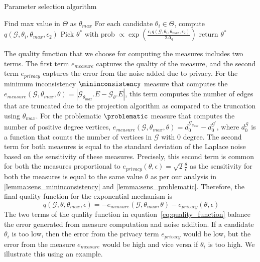\begin{algorithm}
\caption{Parameter selection algorithm}
\label{algo:expo_mech}
    Find max value in $\Theta$ as $\theta_{max}$ \;
    For each candidate $\theta_i \in \Theta$, compute $q(\mathcal{G}, \theta_i, \theta_{max},  \epsilon_2)$ \;
    Pick $\theta^*$ with prob $\propto \exp( \frac{\epsilon_1 q(\mathcal{G}, \theta_i, \theta_{max}, \epsilon_2)}{2\Delta_q})$\;
    return $\theta^*$\;

\end{algorithm}

The quality function that we choose for computing the measures includes two terms. The first term $e_{measure}$  captures the quality of the measure, and the second term $e_{privacy}$ captures the error from the noise added due to privacy. For the minimum inconsistency $\mininconsistency$ measure that computes the $e_{measure}(\mathcal{G}, \theta_{max}, \theta) = |\mathcal{G}_{\theta_{max}}.E - \mathcal{G}_\theta.E|$, this term computes the number of edges that are truncated due to the projection algorithm as compared to the truncation using $\theta_{max}$. For the problematic $\problematic$ measure that computes the number of positive degree vertices, $e_{measure}(\mathcal{G}, \theta_{max}, \theta) = d_0^{\mathcal{G}_{\theta_{max}}} - d_0^{\mathcal{G}^\prime}$, where $d^\mathcal{G}_0$ is a function that counts the number of vertices in $\mathcal{G}$ with $0$ degree. 
The second term for both measures is equal to the standard deviation of the Laplace noise based on the sensitivity of these measures. Precisely, this second term is common for both the measures proportional to $e_{privacy} (\theta, \epsilon) =  \sqrt{2}\frac{\theta}{\epsilon}$ as the sensitivity for both the measures is equal to the same value $\theta$ as per our analysis in  \cref{lemma:sens_mininconsistency} and \cref{lemma:sens_problematic}. Therefore, the final quality function for the exponential mechanism is 
\begin{equation}~\label{eq:quality_function}
    q(\mathcal{G}, \theta, \theta_{max}, \epsilon) = - e_{measure}(\mathcal{G}, \theta_{max}, \theta) - e_{privacy} (\theta, \epsilon)
\end{equation}
The two terms of the quality function in equation~\ref{eq:quality_function} balance the error generated from measure computation and noise addition. If a candidate $\theta_i$ is too low, then the error from the privacy term $e_{privacy}$ would be low, but the error from the measure $e_{measure}$ would be high and vice versa if $\theta_i$ is too high. We illustrate this using an example. 

